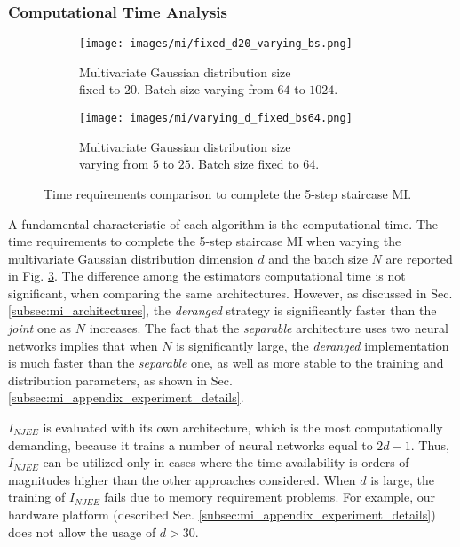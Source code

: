 \subsubsection{Computational Time Analysis}
\label{subsubsec:mi_time_analysis}
\begin{figure}
\centering
\begin{subfigure}{.5\textwidth}
  \centering
  \texttt{[image: images/mi/fixed\_d20\_varying\_bs.png]}
  \caption{Multivariate Gaussian distribution size \\ fixed to $20$. Batch size varying from $64$ to $1024$.}
  \label{fig:MI_timeVaryingBS}
\end{subfigure}%
\begin{subfigure}{.5\textwidth}
  \centering
  \texttt{[image: images/mi/varying\_d\_fixed\_bs64.png]}
  \caption{Multivariate Gaussian distribution size \\ varying from $5$ to $25$. Batch size fixed to $64$.}
  \label{fig:MI_timeVaryingD}
\end{subfigure}
\caption{Time requirements comparison to complete the 5-step staircase MI.}
\label{fig:MI_computationalTimeAnalysisMain}
\end{figure}

A fundamental characteristic of each algorithm is the computational time. 
The time requirements to complete the 5-step staircase MI when varying the multivariate Gaussian distribution dimension $d$ and the batch size $N$ are reported in Fig. \ref{fig:MI_computationalTimeAnalysisMain}.
The difference among the estimators computational time is not significant, when comparing the same architectures.
However, as discussed in Sec. \ref{subsec:mi_architectures}, the \textit{deranged} strategy is significantly faster than the \textit{joint} one as $N$ increases. 
The fact that the \textit{separable} architecture uses two neural networks implies that when $N$ is significantly large, the \textit{deranged} implementation is much faster than the \textit{separable} one, as well as more stable to the training and distribution parameters, as shown in Sec. \ref{subsec:mi_appendix_experiment_details}. 

$I_{NJEE}$ is evaluated with its own architecture, which is the most computationally demanding, because it trains a number of neural networks equal to $2d-1$. Thus, $I_{NJEE}$ can be utilized only in cases where the time availability is orders of magnitudes higher than the other approaches considered.
When $d$ is large, the training of $I_{NJEE}$ fails due to memory requirement problems. For example, our hardware platform (described Sec. \ref{subsec:mi_appendix_experiment_details}) does not allow the usage of $d>30$. 



